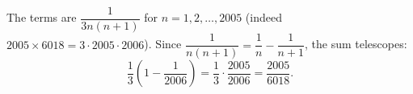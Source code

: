The terms are $\dfrac1{3n(n+1)}$ for $n=1,2,\dots,2005$ (indeed $2005\times6018=3\cdot2005\cdot2006$). Since $\dfrac1{n(n+1)}=\dfrac1n-\dfrac1{n+1}$, the sum telescopes:
\[\dfrac13\left(1-\dfrac1{2006}\right)=\dfrac13\cdot\dfrac{2005}{2006}=\boxed{\dfrac{2005}{6018}}.\]
